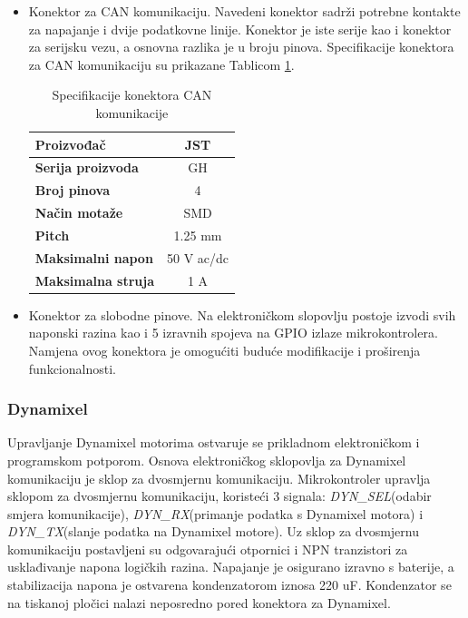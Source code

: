 \documentclass[11pt,a4paper]{article}
\begin{document}
\begin{center}
\begin{itemize}
		
		\item Konektor za CAN komunikaciju. Navedeni konektor sadrži potrebne kontakte za napajanje i dvije podatkovne linije. Konektor je iste serije kao i konektor za serijsku vezu, a osnovna razlika je u broju pinova. Specifikacije konektora za CAN komunikaciju su prikazane Tablicom \ref{tab:specifikacija_connector_CAN}.
		
\begin{table}[H]
	\centering
	\caption{Specifikacije konektora CAN komunikacije}
	\label{tab:specifikacija_connector_CAN}
	\begin{tabular}{|l|c|}
		\hline
		\textbf{Proizvođač} & JST \\ \hline 
		\textbf{Serija proizvoda} & GH \\ \hline 
		\textbf{Broj pinova} & 4 \\ \hline 
		\textbf{Način motaže} & SMD    \\ \hline
		\textbf{Pitch} & 1.25 mm    \\ \hline 
		\textbf{Maksimalni napon} & 50 V  ac/dc\\ \hline 
		\textbf{Maksimalna struja} & 1 A \\ \hline
	\end{tabular}
\end{table}
		
		
		\item Konektor za slobodne pinove. Na elektroničkom slopovlju postoje izvodi svih naponski razina kao i 5 izravnih spojeva na GPIO izlaze mikrokontrolera. Namjena ovog konektora je omogućiti buduće modifikacije i proširenja funkcionalnosti.	
		
	\end{itemize}
\end{center}



\subsubsection{Dynamixel}
 Upravljanje Dynamixel motorima ostvaruje se prikladnom elektroničkom i programskom potporom. Osnova elektroničkog sklopovlja za Dynamixel komunikaciju je sklop za dvosmjernu komunikaciju. Mikrokontroler upravlja sklopom za dvosmjernu komunikaciju, koristeći 3 signala: \textit{DYN\_SEL}(odabir smjera komunikacije), \textit{DYN\_RX}(primanje podatka s Dynamixel motora) i \textit{DYN\_TX}(slanje podatka na Dynamixel motore). Uz sklop za dvosmjernu komunikaciju postavljeni su odgovarajući otpornici i NPN tranzistori za usklađivanje napona logičkih razina. Napajanje je osigurano izravno s baterije, a stabilizacija napona je ostvarena kondenzatorom iznosa 220 uF. Kondenzator se na tiskanoj pločici nalazi neposredno pored konektora za Dynamixel.
\end{document}
